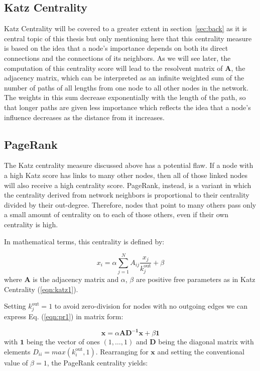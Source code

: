\subsection*{Katz Centrality}
Katz Centrality will be covered to a greater extent in section~\ref{sec:back} as it is central topic of this thesis but only mentioning here that this centrality measure is based on the idea that a node's importance depends on both its direct connections and the connections of its neighbors. As we will see later, the computation of this centrality score will lead to the resolvent matrix of $\mathbf{A}$, the adjacency matrix, which can be interpreted as an infinite weighted sum of the number of paths of all lengths from one node to all other nodes in the network. The weights in this sum decrease exponentially with the length of the path, so that longer paths are given less importance which reflects the idea that a node's influence decreases as the distance from it increases. 


\subsection*{PageRank}

The Katz centrality measure discussed above has a potential flaw. If a node with a high Katz score has links to many other nodes, then all of those linked nodes will also receive a high centrality score. PageRank, instead, is a variant in which the centrality derived from network neighbors is proportional to their centrality divided by their out-degree. Therefore, nodes that point to many others pass only a small amount of centrality on to each of those others, even if their own centrality is high.

In mathematical terms, this centrality is defined by:

\begin{equation}
\label{eqn:pr1}
    x_i= \alpha\sum_{j=1}^{N}A_{ij}\frac{x_j}{k_j^{\text{out}}} + \beta
\end{equation}
where $\mathbf{A}$ is the adjacency matrix and $\alpha$, $\beta$ are positive free parameters as in Katz Centrality (\ref{eqn:katz1}).

Setting $k_j^{\text{out}}=1$ to avoid zero-division for nodes with no outgoing edges we can express Eq. (\ref{eqn:pr1}) in matrix form:

\begin{equation}
\label{eqn:pr2}
    \mathbf{x} = \alpha\mathbf{AD^{-1}x} + \beta \mathbf{1}
\end{equation}
with $\mathbf{1}$ being the vector of ones $(1,\dots,1)$ and $\mathbf{D}$ being the diagonal matrix with elements $D_{ii} = max(k_i^{\text{out}},1)$. Rearranging for $\mathbf{x}$ and setting the conventional value of $\beta=1$, the PageRank centrality yields:

